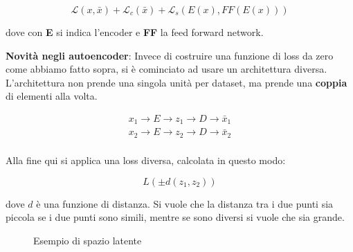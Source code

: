 \[
    \mathcal{L}(x, \bar{x}) + \mathcal{L}_c(\bar{x}) + \mathcal{L}_s(E(x), FF(E(x)))
\]

dove con \textbf{E} si indica l'encoder e \textbf{FF} la feed forward network.

\textbf{Novità negli autoencoder}: Invece di costruire una funzione di loss da zero come abbiamo fatto sopra, si è cominciato ad usare un architettura diversa. L'architettura
non prende una singola unità per dataset, ma prende una \textbf{coppia} di elementi alla volta.

\begin{equation}
    \begin{aligned}
        x_1 \rightarrow E \rightarrow z_1 \rightarrow D \rightarrow \bar{x}_1 \\
        x_2 \rightarrow E \rightarrow z_2 \rightarrow D \rightarrow \bar{x}_2 \\
    \end{aligned}
\end{equation}

Alla fine qui si applica una loss diversa, calcolata in questo modo:

\[
    L(\pm d(z_1, z_2))
\]

dove $d$ è una funzione di distanza. Si vuole che la distanza tra i due punti
sia piccola se i due punti sono simili, mentre se sono diversi si vuole che sia
grande.

\begin{figure}[H]
    \begin{center}
    \end{center}
    \caption{Esempio di spazio latente}
\end{figure}

